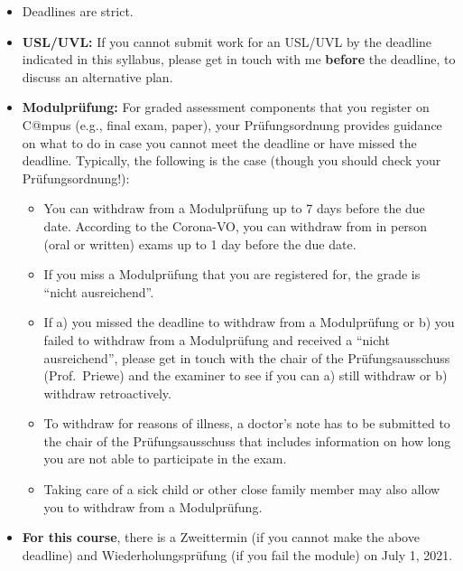\documentclass[12pt,fleqn,a4]{extarticle}
\newcommand{\6}{\mbox{$[\hspace*{-.6mm}[$}}
\newcommand{\9}{\mbox{$]\hspace*{-.6mm}]$}}
\begin{document}
\begin{itemize}[topsep=-1ex,itemsep=-1pt]

\item Deadlines are strict. 

\item {\bf USL/UVL:} If you cannot submit work for an USL/UVL by the deadline indicated in this syllabus, please get in touch with me {\bf before} the deadline, to discuss an alternative plan. 

\item {\bf Modulpr\"ufung:} For graded assessment components that you register on C@mpus (e.g., final exam, paper), your Pr\"ufungsordnung provides guidance on what to do in case you cannot meet the deadline or have missed the deadline. Typically, the following is the case (though you should check your Pr\"ufungsordnung!):

\begin{itemize}[leftmargin=2ex,topsep=-1ex,itemsep=-1pt]

\item You can withdraw from a Modulpr\"ufung up to 7 days before the due date. According to the Corona-VO, you can withdraw from in person (oral or written) exams up to 1 day before the due date. 

\item If you miss a Modulpr\"ufung that you are registered for, the grade is ``nicht ausreichend''.

\item If a) you missed the deadline to withdraw from a Modulpr\"ufung or b) you failed to withdraw from a Modulpr\"ufung and received a ``nicht ausreichend'', please get in touch with the chair of the Pr\"ufungsausschuss (Prof.\ Priewe) and the examiner to see if you can a) still withdraw or b) withdraw retroactively. 

\item To withdraw for reasons of illness, a doctor's note has to be submitted to the chair of the Pr\"ufungsausschuss that includes information on how long you are not able to participate in the exam. 

\item Taking care of a sick child or other close family member may also allow you to withdraw from a Modulpr\"ufung.

\end{itemize}

\item {\bf For this course}, there is a Zweittermin (if you cannot make the above deadline) and Wiederholungspr\"ufung (if you fail the module) on July 1, 2021. 

\end{itemize}
\end{document}

